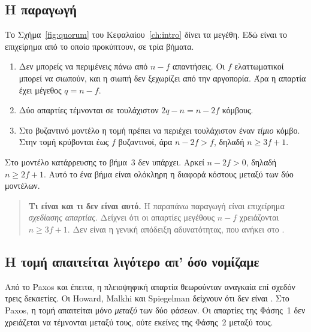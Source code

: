 \subsection{Η παραγωγή}

Το Σχήμα~\ref{fig:quorum} του Κεφαλαίου~\ref{ch:intro} δίνει τα μεγέθη.
Εδώ είναι το επιχείρημα από το οποίο προκύπτουν, σε τρία βήματα.

\begin{enumerate}
  \item Δεν μπορείς να περιμένεις πάνω από $n-f$ απαντήσεις. Οι $f$
  ελαττωματικοί μπορεί να σιωπούν, και η σιωπή δεν ξεχωρίζει από την
  αργοπορία. Άρα η απαρτία έχει μέγεθος $q = n-f$.
  \item Δύο απαρτίες τέμνονται σε τουλάχιστον $2q - n = n - 2f$ κόμβους.
  \item Στο βυζαντινό μοντέλο η τομή πρέπει να περιέχει τουλάχιστον έναν
  \emph{τίμιο} κόμβο. Στην τομή κρύβονται έως $f$ βυζαντινοί, άρα
  $n - 2f > f$, δηλαδή $n \ge 3f+1$.
\end{enumerate}

Στο μοντέλο κατάρρευσης το βήμα~3 δεν υπάρχει. Αρκεί $n - 2f > 0$,
δηλαδή $n \ge 2f+1$. Αυτό το ένα βήμα είναι ολόκληρη η διαφορά κόστους
μεταξύ των δύο μοντέλων.

\begin{quote}\small
\textbf{Τι είναι και τι δεν είναι αυτό.} Η παραπάνω παραγωγή είναι
επιχείρημα \emph{σχεδίασης απαρτίας}. Δείχνει ότι οι απαρτίες μεγέθους
$n-f$ χρειάζονται $n \ge 3f+1$. Δεν είναι η γενική απόδειξη
αδυνατότητας, που ανήκει στο \cite{pease1980reaching}.
\end{quote}

\subsection{Η τομή απαιτείται λιγότερο απ' όσο νομίζαμε}

Από το Paxos και έπειτα, η πλειοψηφική απαρτία θεωρούνταν αναγκαία επί
σχεδόν τρεις δεκαετίες. Οι Howard, Malkhi και Spiegelman δείχνουν ότι
δεν είναι \cite{howard2016flexiblepaxos}. Στο Paxos, η τομή απαιτείται
μόνο \emph{μεταξύ} των δύο φάσεων. Οι απαρτίες της Φάσης~1 δεν
χρειάζεται να τέμνονται μεταξύ τους, ούτε εκείνες της Φάσης~2 μεταξύ
τους.

